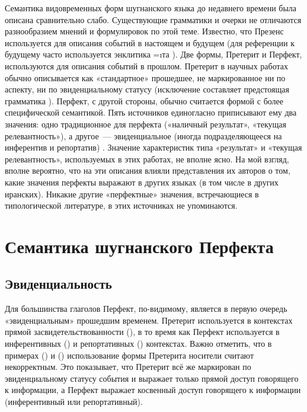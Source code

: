 {{{{Семантика видовременных форм шугнанского языка до недавнего времени была описана сравнительно слабо. Существующие грамматики и очерки не отличаются разнообразием мнений и формулировок по этой теме. Известно, что Презенс используется для описания событий в настоящем и будущем (для референции к будущему часто используется энклитика =\i{та} \parencite[337–342]{parker2023}). Две формы, Претерит и Перфект, используются для описания событий в прошлом. Претерит в научных работах обычно описывается как «стандартное» прошедшее, не маркированное ни по аспекту, ни по эвиденциальному статусу \parencites[154]{karamshoev1963}[370]{edelman1975_tense}[806]{edelman_dodykhudoeva2009_shughni} (исключение составляет предстоящая грамматика \parencite[346]{parker2023}). Перфект, с другой стороны, обычно считается формой с более специфической семантикой. Пять источников единогласно приписывают ему два значения: одно традиционное для перфекта («наличный результат», «текущая релевантность»), а другое~— эвиденциальное (иногда подразделяющееся на инферентив и репортатив) \parencites[161–162]{karamshoev1963}[39]{pakhalina1969_pamir}[370]{edelman1975_tense}[42–43]{bakhtibekov1979}[806]{edelman_dodykhudoeva2009_shughni}. Значение характеристик типа «результат» и «текущая релевантность», используемых в этих работах, не вполне ясно. На мой взгляд, вполне вероятно, что на эти описания влияли представления их авторов о том, какие значения перфекты выражают в других языках (в том числе в других иранских). Никакие другие «перфектные» значения, встречающиеся в типологической литературе, в этих источниках не упоминаются.

\section{Семантика шугнанского Перфекта} \label{evid-sem}

\subsection{Эвиденциальность} \label{evid-evid}

Для большинства глаголов Перфект, по-видимому, является в первую очередь «эвиденциальным» прошедшим временем. Претерит используется в контекстах прямой засвидетельствованности (), в то время как Перфект используется в инферентивных () и репортативных () контекстах. Важно отметить, что в примерах () и () использование формы Претерита носители считают некорректным. Это показывает, что Претерит всё же маркирован по эвиденциальному статусу события и выражает только прямой доступ говорящего к информации, а Перфект выражает косвенный доступ говорящего к информации (инферентивный или репортативный).

}}}}
